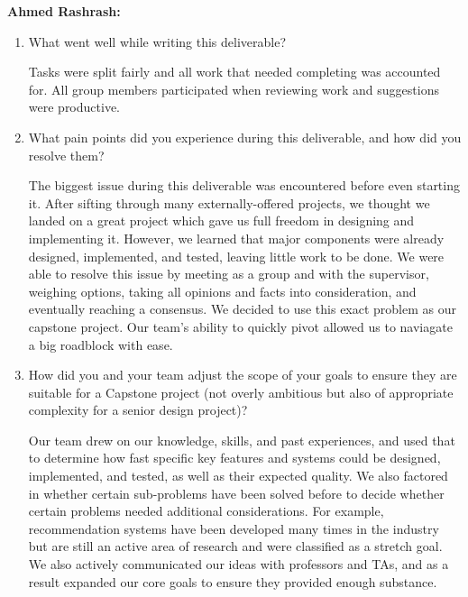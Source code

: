 \documentclass{article}
\begin{document}
\textbf{Ahmed Rashrash:}

\begin{enumerate}
    \item What went well while writing this deliverable?

          Tasks were split fairly and all work that needed completing was
          accounted for. All group members participated when reviewing work and
          suggestions were productive.

    \item What pain points did you experience during this deliverable, and how
          did you resolve them?

          The biggest issue during this deliverable was encountered before even
          starting it. After sifting through many externally-offered projects,
          we thought we landed on a great project which gave us full freedom in
          designing and implementing it. However, we learned that major
          components were already designed, implemented, and tested, leaving
          little work to be done. We were able to resolve this issue by meeting
          as a group and with the supervisor, weighing options, taking all
          opinions and facts into consideration, and eventually reaching a
          consensus. We decided to use this exact problem as our capstone
          project. Our team's ability to quickly pivot allowed us to naviagate
          a big roadblock with ease.

    \item How did you and your team adjust the scope of your goals to ensure
          they are suitable for a Capstone project (not overly ambitious but
          also of appropriate complexity for a senior design project)?

          Our team drew on our knowledge, skills, and past experiences, and
          used that to determine how fast specific key features and systems
          could be designed, implemented, and tested, as well as their expected
          quality. We also factored in whether certain sub-problems have been
          solved before to decide whether certain problems needed additional
          considerations. For example, recommendation systems have been
          developed many times in the industry but are still an active area of
          research and were classified as a stretch goal. We also actively
          communicated our ideas with professors and TAs, and as a result
          expanded our core goals to ensure they provided enough substance.

\end{enumerate}
\end{document}
